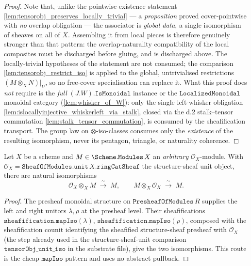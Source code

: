 \begin{proof}
  Note that, unlike the pointwise-existence statement
  \cref{lem:tensorobj_preserves_locally_trivial} --- a \emph{proposition} proved
  cover-pointwise with \emph{no} overlap obligation --- the associator is
  \emph{global data}, a single isomorphism of sheaves on all of \(X\). Assembling it
  from local pieces is therefore genuinely stronger than that pattern: the
  overlap-naturality compatibility of the local composites must be discharged before
  gluing, and is discharged above. The locally-trivial hypotheses of the statement
  are not consumed; the comparison \cref{lem:tensorobj_restrict_iso} is applied to the
  global, untrivialised restrictions \((M \otimes_X N)|_U\), so no free-cover
  specialisation can replace it. What this proof does \emph{not} require is the
  \emph{full} \((J.W).\mathtt{IsMonoidal}\) instance or the
  \(\mathtt{LocalizedMonoidal}\) monoidal category
  (\cref{lem:whisker_of_W}): only the single left-whisker obligation
  \cref{lem:islocallyinjective_whiskerleft_via_stalk}, closed via the d.2 stalk--tensor
  commutation \cref{lem:stalk_tensor_commutation}, is consumed by the sheafification
  transport. The group law on \(\otimes\)-iso-classes
  consumes only the \emph{existence} of the resulting isomorphism, never its pentagon,
  triangle, or naturality coherence.
\end{proof}

\begin{lemma}
  \label{lem:tensorobj_unit_iso}
  Let \(X\) be a scheme and \(M \in \Scheme.\mathtt{Modules}\,X\) an
  \emph{arbitrary} \(\mathcal{O}_X\)-module. With
  \(\mathcal{O}_X = \mathtt{SheafOfModules.unit}\,X.\mathtt{ringCatSheaf}\) the
  structure-sheaf unit object, there are natural isomorphisms
  \[
    \mathcal{O}_X \otimes_X M \;\xrightarrow{\ \sim\ }\; M,
    \qquad
    M \otimes_X \mathcal{O}_X \;\xrightarrow{\ \sim\ }\; M .
  \]
\end{lemma}

\begin{proof}
  The presheaf monoidal structure on \(\mathtt{PresheafOfModules}\,R\) supplies
  the left and right unitors \(\lambda, \rho\) at the presheaf level. Their
  sheafifications \(\mathtt{sheafification.mapIso}(\lambda)\),
  \(\mathtt{sheafification.mapIso}(\rho)\), composed with the sheafification
  counit identifying the sheafified structure-sheaf presheaf with
  \(\mathcal{O}_X\) (the step already used in the structure-sheaf-unit
  comparison \(\mathtt{tensorObj\_unit\_iso}\) in the substrate file), give the
  two isomorphisms. This route is the cheap \(\mathtt{mapIso}\) pattern and uses no
  abstract pullback.
\end{proof}

